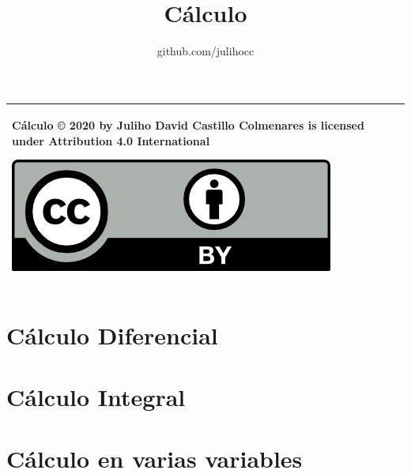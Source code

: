 \documentclass{tufte-book}
\title{Cálculo}
\author{github.com/julihocc}
\begin{document}
	\maketitle
\begin{tabular}{|p{}|}
	\hline
Cálculo © 2020 by Juliho David Castillo Colmenares is licensed under Attribution 4.0 International
	\begin{center}
		\includegraphics[scale=1]{./licencia/by.png}
	\end{center}\\
	\hline
\end{tabular}
\tableofcontents

\chapter{Cálculo Diferencial}









\chapter{Cálculo Integral}









\chapter{Cálculo en varias variables}



%
{}

\end{document}
